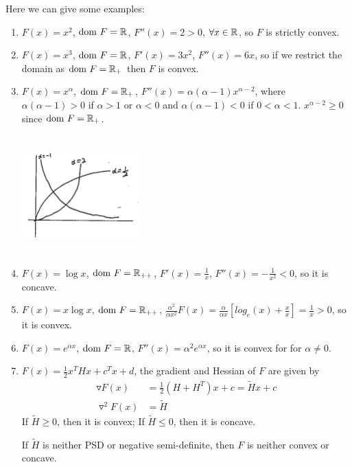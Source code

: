 Here we can give some examples:

\begin{enumerate}
	\item $F(x) = x^2$, $\text{dom}\ F = \mathbb{R}$, $F''(x) = 2 > 0$, $\forall x\in \mathbb{R}$, so $F$ is strictly convex.
	
	\item $F(x) = x^3$, $\text{dom}\ F = \mathbb{R}$, $F'(x) = 3x^2$, $F''(x) = 6x$, so if we restrict the domain as $\text{dom}\ F = \mathbb{R}_+$ then $F$ is convex.
	
	\item $F(x) = x^{\alpha}$, $\text{dom}\ F = \mathbb{R}_+$, $F''(x) = \alpha(\alpha - 1)x^{\alpha - 2}$, where $\alpha(\alpha - 1) > 0$ if $\alpha > 1$ or $\alpha < 0$ and $\alpha(\alpha - 1) < 0$ if $0<\alpha < 1$. $x^{\alpha - 2}\geq 0$ since $\text{dom}\ F = \mathbb{R}_+$.
	
	\begin{marginfigure}
	\centering
	\includegraphics[width=1.8in,height=1.8in]{figures/ch08/figure1106_4.png}
	\end{marginfigure}
	
	\item $F(x) = \log x$, $\text{dom}\ F = \mathbb{R}_{++}$, $F'(x) = \frac{1}{x}$, $F''(x) = -\frac{1}{x^2}<0$, so it is concave.
	
	\item $F(x) = x\log x$, $\text{dom}\ F = \mathbb{R}_{++}$, $\frac{\alpha^2}{\alpha x^2}F(x) = \frac{\alpha}{\alpha x}[log_e(x) + \frac{x}{x}] = \frac{1}{x} > 0$, so it is convex.
	
	\item $F(x) = e^{\alpha x}$, $\text{dom}\ F = \mathbb{R}$, $F''(x) = \alpha^2 e^{\alpha x}$, so it is convex for for $\alpha\neq 0$.
	
	\item $F(x) = \frac{1}{2}x^THx + c^Tx + d$, the gradient and Hessian of $F$ are given by
	\begin{align*}
	\triangledown F(x) &= \frac{1}{2}(H+H^T)x + c = \tilde{H}x + c\\
	\triangledown^2F(x) &= \tilde{H}
	\end{align*}
	If $\tilde{H}\geq 0$, then it is convex; If $\tilde{H}\leq 0$, then it is concave.
	
	If $\tilde{H}$ is neither PSD or negative semi-definite, then $F$ is neither convex or concave.
\end{enumerate}

